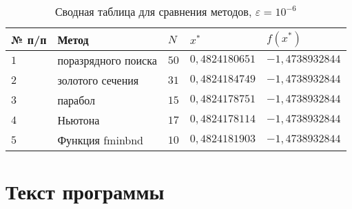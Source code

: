 \documentclass{bmstu-gost-7-32}
\begin{document}
\begin{table}[H]
	\caption{Сводная таблица для сравнения методов, $\varepsilon = 10^{-6}$}
	\begin{tabular}{|l|l|l|l|l|}
		\hline
		№ п/п & Метод               & $N$  & $x^*$          & $f(x^*)$        \\ \hline
		$1$   & поразрядного поиска & $50$ & $0,4824180651$ & $-1,4738932844$ \\ \hline
		$2$   & золотого сечения    & $31$ & $0,4824184749$ & $-1,4738932844$ \\ \hline
		$3$   & парабол             & $15$ & $0,4824178751$ & $-1,4738932844$ \\ \hline
		$4$   & Ньютона             & $17$ & $0,4824178114$ & $-1,4738932844$ \\ \hline
		$5$   & Функция fminbnd     & $10$ & $0,4824181903$ & $-1,4738932844$ \\ \hline
	\end{tabular}
\end{table}

\section*{Текст программы}


\end{document}
